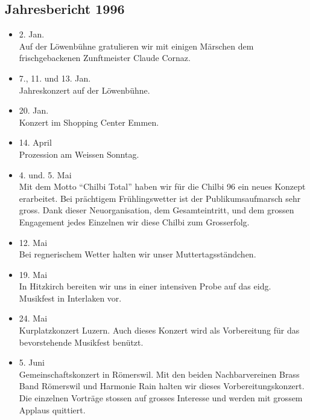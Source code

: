 \subsection{Jahresbericht 1996}

\begin{history}


    \begin{itemize}

        \item[]2. Jan.\\
        Auf der Löwenbühne gratulieren wir mit einigen Märschen dem
        frischgebackenen Zunftmeister Claude Cornaz.

        \item[]7., 11. und 13. Jan.\\
        Jahreskonzert auf der Löwenbühne.

        \item[]20. Jan.\\
        Konzert im Shopping Center Emmen.

        \item[]14. April\\
        Prozession am Weissen Sonntag.

        \item[]4. und. 5. Mai\\
        Mit dem Motto \enquote{Chilbi Total} haben wir für die Chilbi 96 ein
        neues Konzept erarbeitet. Bei prächtigem Frühlingswetter ist der
        Publikumsaufmarsch sehr gross. Dank dieser Neuorganisation, dem
        Gesamteintritt, und dem grossen Engagement jedes Einzelnen wir diese
        Chilbi zum Grosserfolg.

        \item[]12. Mai\\
        Bei regnerischem Wetter halten wir unser Muttertagsständchen.

        \item[]19. Mai\\
        In Hitzkirch bereiten wir uns in einer intensiven Probe auf das eidg.
        Musikfest in Interlaken vor.

        \item[]24. Mai\\
        Kurplatzkonzert Luzern. Auch dieses Konzert wird als Vorbereitung für
        das bevorstehende Musikfest benützt.

        \item[]5. Juni\\
        Gemeinschaftskonzert in Römerswil. Mit den beiden Nachbarvereinen Brass
        Band Römerswil und Harmonie Rain halten wir dieses Vorbereitungskonzert.
        Die einzelnen Vorträge stossen auf grosses Interesse und werden mit
        grossem Applaus quittiert.


\end{itemize}
\end{history}

